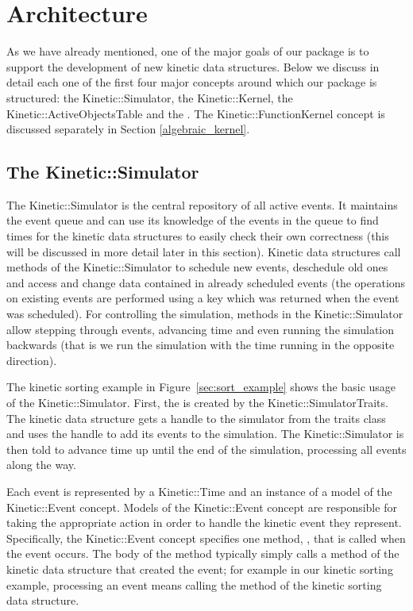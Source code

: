 
\section{Architecture}
\label{sec:architecture}

As we have already mentioned, one of the major goals of our package is
to support the development of new kinetic data structures. Below we
discuss in detail each one of the first four major concepts around which our
package is structured: the Kinetic::Simulator, the
Kinetic::Kernel, the Kinetic::ActiveObjectsTable and the
.  The Kinetic::FunctionKernel concept is
discussed separately in Section \ref{algebraic_kernel}.

\subsection{The Kinetic::Simulator}
\label{simulator}

The Kinetic::Simulator is the central repository of all active events.
It maintains the event queue and can use its knowledge of the events
in the queue to find times for the kinetic data structures to easily
check their own correctness (this will be discussed in more detail
later in this section). Kinetic data structures call methods of the
Kinetic::Simulator to schedule new events, deschedule old ones and
access and change data contained in already scheduled events (the
operations on existing events are performed using a key which was
returned when the event was scheduled).  For controlling the
simulation, methods in the Kinetic::Simulator allow stepping through
events, advancing time and even running the simulation backwards (that
is we run the simulation with the time running in the opposite
direction).

The kinetic sorting example in Figure~\ref{sec:sort_example} shows the
basic usage of the Kinetic::Simulator. First, the 
is created by the Kinetic::SimulatorTraits. The kinetic data structure
gets a handle to the simulator from the traits class and uses the
handle to add its events to the simulation. The Kinetic::Simulator is
then told to advance time up until the end of the simulation,
processing all events along the way.

Each event is represented by a Kinetic::Time and an instance of a
model of the Kinetic::Event concept.  Models of the Kinetic::Event
concept are responsible for taking the appropriate action in order to
handle the kinetic event they represent.  Specifically, the
Kinetic::Event concept specifies one method,
, that is called when the event occurs.
The body of the  method typically
simply calls a method of the kinetic data structure that created the
event; for example in our kinetic sorting example, processing an event
means calling the 
method of the kinetic sorting data structure.

